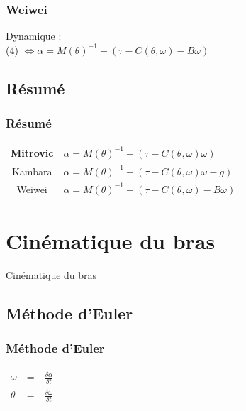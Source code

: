 \documentclass{beamer}
\begin{document}
\begin{frame}
\frametitle{Weiwei}
Dynamique :\\
(4) $\Leftrightarrow \alpha = M(\theta)^{-1} + (\tau - C(\theta, \omega) - B\omega) $
\end{frame}

\subsection{Résumé}

\begin{frame}
\frametitle{Résumé}
\begin{tabular}{|c|l|}
    \hline
    Mitrovic  & $\alpha = M(\theta)^{-1} + (\tau - C(\theta, \omega) \omega)$ \\
    \hline
    Kambara  & $\alpha = M(\theta)^{-1} + (\tau - C(\theta, \omega) \omega - g)$ \\
    \hline
    Weiwei  & $\alpha = M(\theta)^{-1} + (\tau - C(\theta, \omega) - B\omega)$ \\
    \hline
\end{tabular}
\end{frame}


\section{Cinématique du bras}
\begin{frame}
\begin{center}
{\LARGE Cinématique du bras}
\end{center}
\end{frame}

\subsection{Méthode d'Euler}

\begin{frame}
\frametitle{Méthode d'Euler}
\begin{tabular}{lcl}
    $\omega$ & = & $\frac{\delta \alpha}{\delta t}$ \\
    $\theta$ & = & $\frac{\delta \omega}{\delta t}$ \\
\end{tabular}
\end{frame}
    
\end{document}
